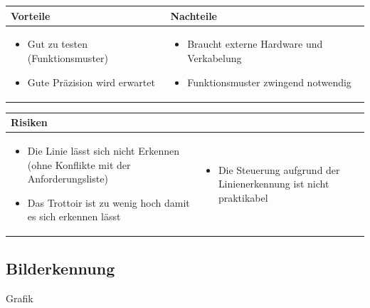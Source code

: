 \begin{table}[h]
\begin{tabular}{p{} | p{}}


 \textbf{Vorteile} & \textbf{Nachteile} \\ \hline
	 
\begin{itemize}
\item Gut zu testen (Funktionsmuster)
\item Gute Präzision wird erwartet
\end{itemize}

 
 &
 
\begin{itemize}
\item Braucht externe Hardware und Verkabelung
\item Funktionsmuster zwingend notwendig
\end{itemize}

\end{tabular}
\end{table}

\begin{table}[h]
\begin{tabular}{p{}p{}}

 \textbf{Risiken} & \\ \hline
	 
\begin{itemize}
\item Die Linie lässt sich nicht Erkennen (ohne Konflikte mit der Anforderungsliste)
\item Das Trottoir ist zu wenig hoch damit es sich erkennen lässt
\end{itemize}
&
\begin{itemize}
\item Die Steuerung aufgrund der Linienerkennung ist nicht praktikabel
\end{itemize}

 
\end{tabular}
\end{table}

\pagebreak


\subsection{Bilderkennung}
Grafik

